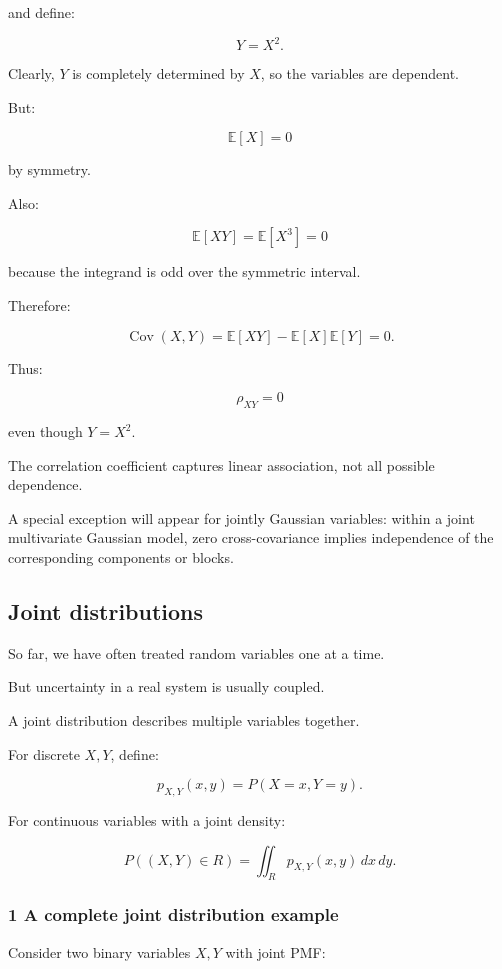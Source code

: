 and define:

\[
 Y=X^2.
\]

Clearly, \(Y\) is completely determined by \(X\), so the variables are dependent.

But:

\[
 \mathbb E[X]=0
\]

by symmetry.

Also:

\[
 \mathbb E[XY] = \mathbb E[X^3]=0
\]

because the integrand is odd over the symmetric interval.

Therefore:

\[
 \operatorname{Cov}(X,Y) = \mathbb E[XY]-\mathbb E[X]\mathbb E[Y] =0.
\]

Thus:

\[
 \boxed{\rho_{XY}=0}
\]

even though \(Y=X^2\).

The correlation coefficient captures linear association, not all possible dependence.

A special exception will appear for jointly Gaussian variables: within a joint multivariate Gaussian model, zero cross-covariance implies independence of the corresponding components or blocks.

\subsection{Joint distributions}\label{02-foundations-ii-ch023-joint-distributions}

So far, we have often treated random variables one at a time.

But uncertainty in a real system is usually coupled.

A joint distribution describes multiple variables together.

For discrete \(X,Y\), define:

\[
 \boxed{ p_{X,Y}(x,y)=P(X=x,Y=y) }.
\]

For continuous variables with a joint density:

\[
 \boxed{ P((X,Y)\in R) = \iint_Rp_{X,Y}(x,y)\,dx\,dy }.
\]

\subsubsection{1 A complete joint distribution example}\label{02-foundations-ii-ch023-a-complete-joint-distribution-example}

Consider two binary variables \(X,Y\) with joint PMF:

